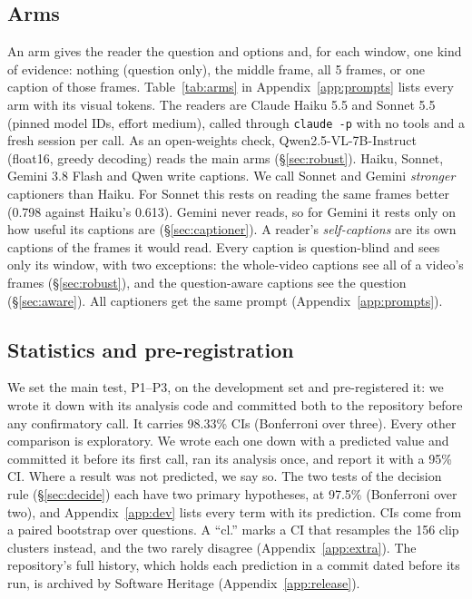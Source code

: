 \documentclass[11pt]{article}
\newcommand{\cl}{cl.}
\begin{document}
\subsection{Arms}
\label{sec:arms}

An arm gives the reader the question and options and, for each window, one kind of evidence: nothing (question only), the middle frame, all 5 frames, or one caption of those frames. Table~\ref{tab:arms} in Appendix~\ref{app:prompts} lists every arm with its visual tokens. The readers are Claude Haiku 5.5 and Sonnet 5.5 (pinned model IDs, effort medium), called through \texttt{claude -p} with no tools and a fresh session per call. As an open-weights check, Qwen2.5-VL-7B-Instruct \citep{qwen25vl} (float16, greedy decoding) reads the main arms (\S\ref{sec:robust}). Haiku, Sonnet, Gemini 3.8 Flash and Qwen write captions. We call Sonnet and Gemini \emph{stronger} captioners than Haiku. For Sonnet this rests on reading the same frames better (0.798 against Haiku's 0.613). Gemini never reads, so for Gemini it rests only on how useful its captions are (\S\ref{sec:captioner}). A reader's \emph{self-captions} are its own captions of the frames it would read. Every caption is question-blind and sees only its window, with two exceptions: the whole-video captions see all of a video's frames (\S\ref{sec:robust}), and the question-aware captions see the question (\S\ref{sec:aware}). All captioners get the same prompt (Appendix~\ref{app:prompts}).

\subsection{Statistics and pre-registration}
\label{sec:stats}
We set the main test, P1--P3, on the development set and pre-registered it: we wrote it down with its analysis code and committed both to the repository before any confirmatory call. It carries 98.33\% CIs (Bonferroni over three). Every other comparison is exploratory. We wrote each one down with a predicted value and committed it before its first call, ran its analysis once, and report it with a 95\% CI. Where a result was not predicted, we say so. The two tests of the decision rule (\S\ref{sec:decide}) each have two primary hypotheses, at 97.5\% (Bonferroni over two), and Appendix~\ref{app:dev} lists every term with its prediction. CIs come from a paired bootstrap over questions. A ``\cl'' marks a CI that resamples the 156 clip clusters instead, and the two rarely disagree (Appendix~\ref{app:extra}). The repository's full history, which holds each prediction in a commit dated before its run, is archived by Software Heritage (Appendix~\ref{app:release}).
\end{document}
